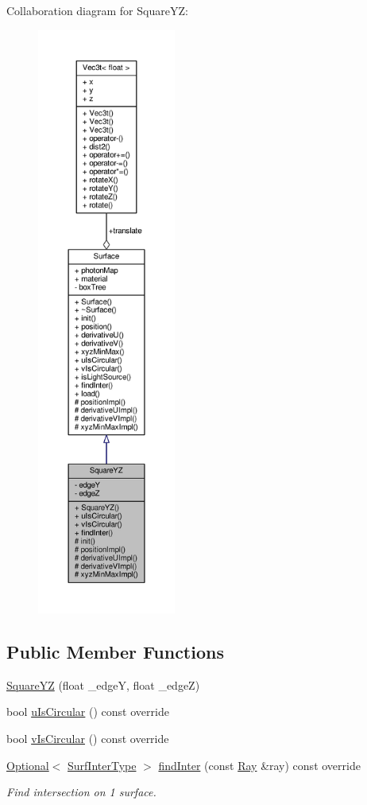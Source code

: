 Collaboration diagram for Square\+YZ\+:
\nopagebreak
\begin{figure}[H]
\begin{center}
\leavevmode
\includegraphics[height=550pt]{classSquareYZ__coll__graph}
\end{center}
\end{figure}
\subsection*{Public Member Functions}
\begin{DoxyCompactItemize}
\item 
\hyperlink{classSquareYZ_a3d88bfd27f8d9a833a54ef3d2d885831}{Square\+YZ} (float \+\_\+edgeY, float \+\_\+edgeZ)
\item 
bool \hyperlink{classSquareYZ_adc74593250e7aaf7f8d733e22e3951b6}{u\+Is\+Circular} () const override
\item 
bool \hyperlink{classSquareYZ_ab6a94e65acedccedd4556023b1490841}{v\+Is\+Circular} () const override
\item 
\hyperlink{classOptional}{Optional}$<$ \hyperlink{structSurfInterType}{Surf\+Inter\+Type} $>$ \hyperlink{classSquareYZ_a75ffd1eda4c026706513dfa07043ffc8}{find\+Inter} (const \hyperlink{structRay}{Ray} \&ray) const override
\begin{DoxyCompactList}\small\item\em Find intersection on 1 surface. \end{DoxyCompactList}\end{DoxyCompactItemize}

